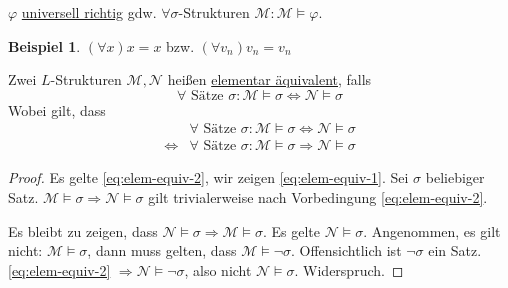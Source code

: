 \documentclass{article}
\theoremstyle{definition}
\newtheorem*{bsp}{Beispiel}
\theoremstyle{plain}
\newcommand{\m}[1]{\mathcal{#1}}
\begin{document}
    $ \varphi $ \underline{universell richtig} gdw. $ \forall \sigma$-Strukturen $ \m{M}: \m{M} \models \varphi $.
    \begin{bsp}
        $ (\forall x) x = x $ bzw. $ (\forall v_n) v_n = v_n $
    \end{bsp}

    Zwei $ L $-Strukturen $ \m{M}, \m{N} $ heißen \underline{elementar äquivalent}, falls
    \begin{equation*}
        \forall \text{ Sätze } \sigma: \m{M} \models \sigma \Leftrightarrow \m{N} \models \sigma
    \end{equation*}
    Wobei gilt, dass
    \begin{align}
        & \forall \text{ Sätze } \sigma: \m{M} \models \sigma \Leftrightarrow \m{N} \models \sigma \label{eq:elem-equiv-1} \\
        \Leftrightarrow & \forall \text{ Sätze } \sigma: \m{M} \models \sigma \Rightarrow \m{N} \models \sigma \label{eq:elem-equiv-2}
    \end{align}

    \begin{proof}
        Es gelte \eqref{eq:elem-equiv-2}, wir zeigen \eqref{eq:elem-equiv-1}.
        Sei $ \sigma $ beliebiger Satz.
        $ \m{M} \models \sigma \Rightarrow \m{N} \models \sigma $
        gilt trivialerweise nach Vorbedingung \eqref{eq:elem-equiv-2}.

        Es bleibt zu zeigen, dass $ \m{N} \models \sigma \Rightarrow \m{M} \models \sigma $.
        Es gelte $ \m{N} \models \sigma $.
        Angenommen, es gilt nicht: $ \m{M} \models \sigma $, dann muss gelten, dass $ \m{M} \models \neg \sigma $.
        Offensichtlich ist $ \neg \sigma $ ein Satz.
        \eqref{eq:elem-equiv-2} $ \Rightarrow \m{N} \models \neg \sigma $, also nicht $ \m{N} \models \sigma $. Widerspruch.
    \end{proof}
\end{document}
